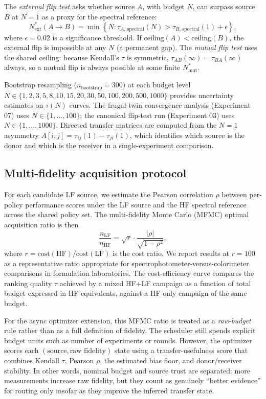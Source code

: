 \documentclass[twoside,twocolumn,9pt]{article}
\begin{document}
The \emph{external flip test} asks whether source $A$, with budget $N$, can surpass source $B$ at $N=1$ as a proxy for the spectral reference:
\[
N^*_{\mathrm{ext}}(A \to B) = \min\!\left\{ N : \tau_{A,\,\mathrm{spectral}}(N) > \tau_{B,\,\mathrm{spectral}}(1) + \epsilon \right\},
\]
where $\epsilon = 0.02$ is a significance threshold. If $\mathrm{ceiling}(A) < \mathrm{ceiling}(B)$, the external flip is impossible at any $N$ (a permanent gap). The \emph{mutual flip test} uses the shared ceiling: because Kendall's $\tau$ is symmetric, $\tau_{AB}(\infty) = \tau_{BA}(\infty)$ always, so a mutual flip is always possible at some finite $N^*_{\mathrm{mut}}$.

Bootstrap resampling ($n_\mathrm{bootstrap} = 300$) at each budget level $N \in \{1, 2, 3, 5, 8, 10, 15, 20, 30, 50, 100, 200, 500, 1000\}$ provides uncertainty estimates on $\tau(N)$ curves. The frugal-twin convergence analysis (Experiment 07) uses $N \in \{1, \ldots, 100\}$; the canonical flip-test run (Experiment 03) uses $N \in \{1, \ldots, 1000\}$. Directed transfer matrices are computed from the $N = 1$ asymmetry $A[i,j] = \tau_{ij}(1) - \tau_{ji}(1)$, which identifies which source is the donor and which is the receiver in a single-experiment comparison.

\subsection{Multi-fidelity acquisition protocol}

For each candidate LF source, we estimate the Pearson correlation $\rho$ between per-policy performance scores under the LF source and the HF spectral reference across the shared policy set. The multi-fidelity Monte Carlo (MFMC) optimal acquisition ratio is then\cite{Peherstorfer2018SurveyMF}
\[
\frac{n_\mathrm{LF}}{n_\mathrm{HF}} = \sqrt{r} \cdot \frac{|\rho|}{\sqrt{1 - \rho^2}},
\]
where $r = \mathrm{cost}(\mathrm{HF}) / \mathrm{cost}(\mathrm{LF})$ is the cost ratio. We report results at $r = 100$ as a representative ratio appropriate for spectrophotometer-versus-colorimeter comparisons in formulation laboratories. The cost-efficiency curve compares the ranking quality $\tau$ achieved by a mixed HF+LF campaign as a function of total budget expressed in HF-equivalents, against a HF-only campaign of the same budget.

For the async optimizer extension, this MFMC ratio is treated as a \emph{raw-budget} rule rather than as a full definition of fidelity. The scheduler still spends explicit budget units such as number of experiments or rounds. However, the optimizer scores each $(\text{source}, \text{raw fidelity})$ state using a transfer-usefulness score that combines Kendall $\tau$, Pearson $\rho$, the estimated bias floor, and donor/receiver stability. In other words, nominal budget and source trust are separated: more measurements increase raw fidelity, but they count as genuinely ``better evidence'' for routing only insofar as they improve the inferred transfer state.
\end{document}
